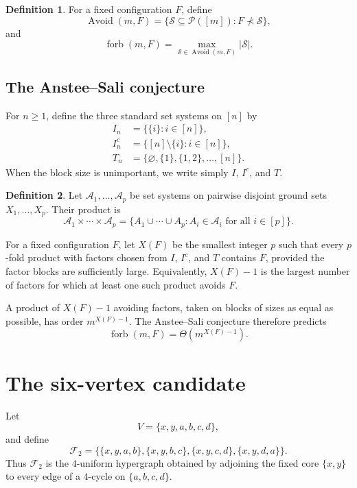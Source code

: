 \documentclass[11pt]{article}
\theoremstyle{definition}
\newtheorem{definition}{Definition}[section]
\newcommand{\forb}{\operatorname{forb}}
\newcommand{\Avoid}{\operatorname{Avoid}}
\newcommand{\cF}{\mathcal F}
\begin{document}
	\begin{definition}
		For a fixed configuration $F$, define
		\[
		\Avoid(m,F)
		=
		\{\mathcal S\subseteq\mathcal P([m]):F\not\prec\mathcal S\},
		\]
		and
		\[
		\forb(m,F)
		=
		\max_{\mathcal S\in\Avoid(m,F)}|\mathcal S|.
		\]
	\end{definition}
	
	\subsection{The Anstee--Sali conjecture}
	
	For $n\ge 1$, define the three standard set systems on $[n]$ by
	\begin{align*}
		I_n
		&=\bigl\{\{i\}:i\in[n]\bigr\},\\
		I_n^c
		&=\bigl\{[n]\setminus\{i\}:i\in[n]\bigr\},\\
		T_n
		&=\bigl\{\varnothing,\{1\},\{1,2\},\ldots,[n]\bigr\}.
	\end{align*}
	When the block size is unimportant, we write simply $I$, $I^c$, and $T$.
	
	\begin{definition}
		Let $\mathcal A_1,\ldots,\mathcal A_p$ be set systems on pairwise disjoint
		ground sets $X_1,\ldots,X_p$. Their product is
		\[
		\mathcal A_1\times\cdots\times\mathcal A_p
		=
		\{A_1\cup\cdots\cup A_p:A_i\in\mathcal A_i\text{ for all }i\in[p]\}.
		\]
	\end{definition}
	
	For a fixed configuration $F$, let $X(F)$ be the smallest integer $p$ such
	that every $p$-fold product with factors chosen from $I$, $I^c$, and $T$
	contains $F$, provided the factor blocks are sufficiently large. Equivalently,
	$X(F)-1$ is the largest number of factors for which at least one such product
	avoids $F$.
	
	A product of $X(F)-1$ avoiding factors, taken on blocks of sizes as equal as
	possible, has order $m^{X(F)-1}$. The Anstee--Sali conjecture therefore predicts
	\[
	\forb(m,F)=\Theta\!\left(m^{X(F)-1}\right).
	\]
	
	\section{The six-vertex candidate}
	
	Let
	\[
	V=\{x,y,a,b,c,d\},
	\]
	and define
	\begin{equation}\label{eq:F2}
		\cF_2
		=
		\bigl\{
		\{x,y,a,b\},
		\{x,y,b,c\},
		\{x,y,c,d\},
		\{x,y,d,a\}
		\bigr\}.
	\end{equation}
	Thus $\cF_2$ is the $4$-uniform hypergraph obtained by adjoining the fixed
	core $\{x,y\}$ to every edge of a $4$-cycle on $\{a,b,c,d\}$.
	
\end{document}

